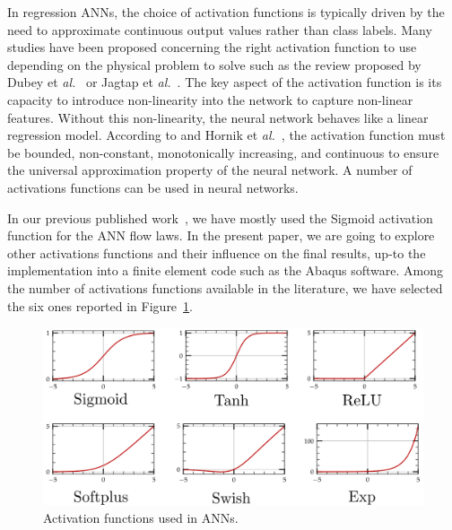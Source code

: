 \documentclass[algorithms,article,submit,pdftex,oneauthors]{Definitions/mdpi}
\makeatletter
\DeclareRobustCommand{\eal}{et \emph{al.}\@\xspace}
\makeatother
\begin{document}
In regression ANNs, the choice of activation functions is typically driven by the need to approximate continuous output values rather than class labels.
Many studies have been proposed concerning the right activation function to use depending on the physical problem to solve such as the review proposed by Dubey \eal~\cite{Dubey-2022-AFD} or Jagtap \eal~\cite{Jagtap-2023-HIA}.
The key aspect of the activation function is its capacity to introduce non-linearity into the network to capture non-linear features.
Without this non-linearity, the neural network behaves like a linear regression model.
According to and Hornik \eal~\cite{Hornik-1989-MFN}, the activation function must be bounded, non-constant, monotonically increasing, and continuous to ensure the universal approximation property of the neural network.
A number of activations functions can be used in neural networks.

In our previous published work~\cite{Pantale-2021-EIN, Pantale-2023-DIA}, we have mostly used the Sigmoid activation function for the ANN flow laws.
In the present paper, we are going to explore other activations functions and their influence on the final results, up-to the implementation into a finite element code such as the Abaqus software.
Among the number of activations functions available in the literature, we have selected the six ones reported in Figure~\ref{fig:ActFunctions}.
\begin{figure}[h!]
\centering
\includegraphics[width=0.8\columnwidth]{Figures/ActFunctions}
\caption{Activation functions used in ANNs.}
\label{fig:ActFunctions}
\end{figure}
\end{document}
